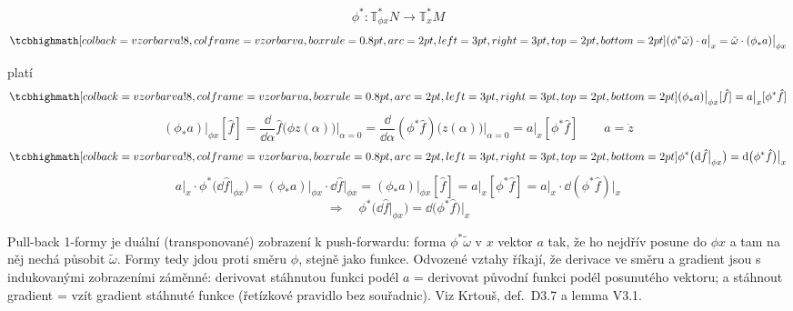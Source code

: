 \begin{minipage}{0.5\textwidth}
\begin{definice}
\[
  \phi^*: \mathbb{T}^*_{\phi x}N\to\mathbb{T}^*_xM
\]
\[
  \vzorec{(\phi^*\tilde\omega)\cdot a\big|_x = \tilde\omega\cdot(\phi_*a)\big|_{\phi x}}
\]
\end{definice}
\end{minipage}
\hfill
\begin{minipage}{0.47\textwidth}
\centering
{}
\end{minipage}

platí
\[
  \vzorec{(\phi_*a)\big|_{\phi x}[\hat f] = a\big|_x[\phi^*\hat f]}
\]
\[
  (\phi_*a)\big|_{\phi x}[\hat f] = \frac{\dd}{\dd\alpha}\hat f\big(\phi z(\alpha)\big)\Big|_{\alpha=0}
  = \frac{\dd}{\dd\alpha}(\phi^*\hat f)\big(z(\alpha)\big)\Big|_{\alpha=0} = a\big|_x[\phi^*\hat f]
  \qquad a = \dot z
\]
\[
  \vzorec{\phi^*\big(\dd\hat f\big|_{\phi x}\big) = \dd\big(\phi^*\hat f\big)\big|_x}
\]
\[
  a\big|_x\cdot\phi^*\big(\dd\hat f\big|_{\phi x}\big) = (\phi_*a)\big|_{\phi x}\cdot\dd\hat f\big|_{\phi x}
  = (\phi_*a)\big|_{\phi x}[\hat f] = a\big|_x[\phi^*\hat f] = a\big|_x\cdot\dd(\phi^*\hat f)\big|_x
\]
\[
  \Rightarrow\quad \phi^*\big(\dd\hat f\big|_{\phi x}\big) = \dd\big(\phi^*\hat f\big)\big|_x
\]

\begin{vysvetleni}
Pull-back 1-formy je duální (transponované) zobrazení k push-forwardu: forma $\phi^*\tilde\omega$ v $x$  vektor $a$ tak, že ho nejdřív posune do $\phi x$ a tam na něj nechá působit $\tilde\omega$. Formy tedy jdou proti směru $\phi$, stejně jako funkce. Odvozené vztahy říkají, že derivace ve směru a gradient jsou s indukovanými zobrazeními záměnné: derivovat stáhnutou funkci podél $a$ = derivovat původní funkci podél posunutého vektoru; a stáhnout gradient = vzít gradient stáhnuté funkce (řetízkové pravidlo bez souřadnic). Viz Krtouš, def.\ D3.7 a lemma V3.1.
\end{vysvetleni}

